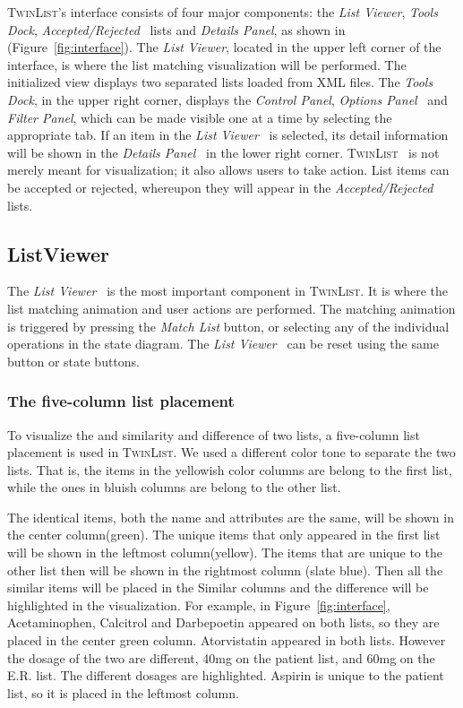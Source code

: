 \documentclass{chi2009}
\newcommand{\TwinList}{\textsc{TwinList}}
\newcommand{\ListViewer}{\textit{List Viewer}}
\newcommand{\AcceptedRejected}{\textit{Accepted/Rejected}}
\newcommand{\Details}{\textit{Details Panel}}
\newcommand{\Tools}{\textit{Tools Dock}}
\newcommand{\Controls}{\textit{Control Panel}}
\newcommand{\Filters}{\textit{Filter Panel}}
\newcommand{\Options}{\textit{Options Panel}}
\begin{document}
\TwinList's interface consists of four major components: the \ListViewer, \Tools, \AcceptedRejected~ lists and \Details, as shown in (Figure~\ref{fig:interface}). The \ListViewer, located in the upper left corner of the interface, is where the list matching visualization will be performed. The initialized view displays two separated lists loaded from XML files. The \Tools, in the upper right corner, displays the \Controls, \Options~ and \Filters, which can be made visible one at a time by selecting the appropriate tab. If an item in the \ListViewer~ is selected, its detail information will be shown in the \Details~ in the lower right corner. \TwinList~ is not merely meant for visualization; it also allows users to take action. List items can be accepted or rejected, whereupon they will appear in the \AcceptedRejected~ lists.

\subsection{ListViewer}
The  \ListViewer~ is the most important component in \TwinList. It is where the list matching animation and user actions are performed. The matching animation is triggered by pressing the \textit{Match List} button, or selecting any of the individual operations in the state diagram. The \ListViewer~ can be reset using the same button or state buttons.

\subsubsection{The five-column list placement}
To visualize the and similarity and difference of two lists, a five-column list placement is used in \TwinList. We used a different color tone to separate the two lists. That is, the items in the yellowish color columns are belong to the first list, while the ones in bluish columns are belong to the other list. 

The identical items, both the name and attributes are the same, will be shown in the center column(green). The unique items that only appeared in the first list will be shown in the leftmost column(yellow). The items that are unique to the other list then will be shown in the rightmost column (slate blue). Then all the similar items will be placed in the Similar columns and the difference will be highlighted in the visualization. For example, in Figure~\ref{fig:interface}, Acetaminophen, Calcitrol and Darbepoetin appeared on both lists, so they are placed in the center green column. Atorvistatin appeared in both lists. However the dosage of the two are different, 40mg on the patient list, and 60mg on the E.R. list. The different dosages are highlighted. Aspirin is unique to the patient list, so it is placed in the leftmost column.
\end{document}
